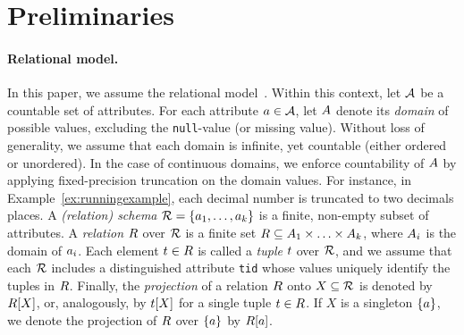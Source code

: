 \section{Preliminaries}
\label{sec:preliminaries}

\paragraph{Relational model.}
In this paper, we assume the relational model~\cite{Codd1970}.
Within this context, let $\mathcal{A}$ be a countable set of attributes.
For each attribute $a \in \mathcal{A}$, let $A$ denote its \emph{domain} of possible values, excluding the \texttt{null}-value (or missing value).
Without loss of generality, we assume that each domain is infinite, yet countable (either ordered or unordered).
In the case of continuous domains, we enforce countability of $A$ by applying fixed-precision truncation on the domain values.
For instance, in Example~\ref{ex:runningexample}, each decimal number is truncated to two decimals places.
A \emph{(relation) schema} $\mathcal{R} = \{a_{1},\ldots,a_{k}\}$ is a finite, non-empty subset of attributes.
A \emph{relation} $R$ over $\mathcal{R}$ is a finite set $R \subseteq A_{1} \times \ldots \times A_{k}$, where $A_{i}$ is the domain of $a_{i}$.
Each element $t \in R$ is called a \emph{tuple} $t$ over $\mathcal{R}$, and we assume that each $\mathcal{R}$ includes a distinguished attribute \texttt{tid} whose values uniquely identify the tuples in $R$.
Finally, the \emph{projection} of a relation $R$ onto $X \subseteq \mathcal{R}$ is denoted by $R[X]$, or, analogously, by $t[X]$ for a single tuple $t \in R$.
If $X$ is a singleton $\{a\}$, we denote the projection of $R$ over $\{a\}$ by $R[a]$.


